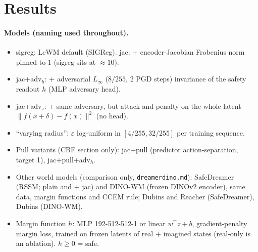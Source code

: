 \documentclass{article}
\begin{document}
\section{Results}

\paragraph{Models (naming used throughout).}
\begin{itemize}
  \item sigreg: LeWM default (SIGReg). jac: + encoder-Jacobian Frobenius norm pinned to 1 (sigreg sits at $\approx 10$).
  \item jac+adv$_h$: + adversarial $L_\infty$ ($8/255$, 2 PGD steps) invariance of the safety readout $h$ (MLP adversary head).
  \item jac+adv$_z$: + same adversary, but attack and penalty on the whole latent $\|f(x+\delta)-f(x)\|^2$ (no head).
  \item ``varying radius'': $\varepsilon$ log-uniform in $[4/255, 32/255]$ per training sequence.
  \item Pull variants (CBF section only): jac+pull (predictor action-separation, target 1), jac+pull+adv$_h$.
  \item Other world models (comparison only, \texttt{dreamerdino.md}): SafeDreamer (RSSM; plain and + jac) and DINO-WM (frozen DINOv2 encoder), same data, margin functions and CCEM rule; Dubins and Reacher (SafeDreamer), Dubins (DINO-WM).
  \item Margin function $h$: MLP 192-512-512-1 or linear $w^\top z+b$, gradient-penalty margin loss, trained on frozen latents of real + imagined states (real-only is an ablation). $h\ge 0$ = safe.
\end{itemize}
\end{document}
